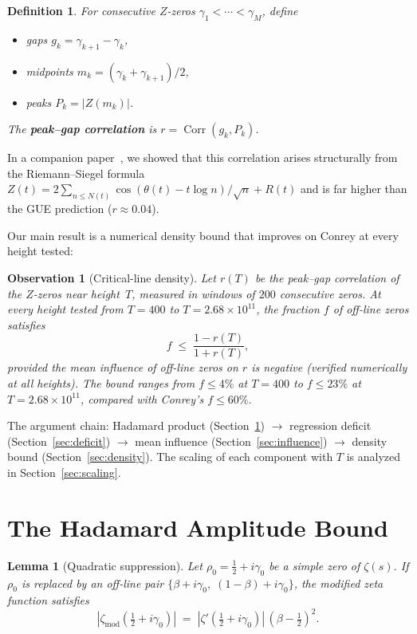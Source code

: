 \documentclass[11pt,a4paper]{article}
\newtheorem{lemma}[theorem]{Lemma}
\newtheorem{definition}[theorem]{Definition}
\newtheorem{observation}[theorem]{Observation}
\DeclareMathOperator{\Corr}{Corr}
\begin{document}
\begin{definition}\label{def:peakgap}
For consecutive $Z$-zeros $\gamma_1 < \cdots < \gamma_M$, define
\begin{itemize}[nosep]
\item gaps $g_k = \gamma_{k+1} - \gamma_k$,
\item midpoints $m_k = (\gamma_k+\gamma_{k+1})/2$,
\item peaks $P_k = |Z(m_k)|$.
\end{itemize}
The \textbf{peak--gap correlation} is $r = \Corr(g_k, P_k)$.
\end{definition}

In a companion paper~\cite{EigRigidity}, we showed that this correlation arises structurally from the Riemann--Siegel formula $Z(t) = 2\sum_{n \leq N(t)} \cos(\theta(t)-t\log n)/\sqrt{n} + R(t)$ and is far higher than the GUE prediction ($r \approx 0.04$).

Our main result is a numerical density bound that improves on Conrey at every height tested:

\begin{observation}[Critical-line density]\label{obs:density}
Let $r(T)$ be the peak--gap correlation of the $Z$-zeros near height~$T$, measured in windows of $200$ consecutive zeros.
At every height tested from $T = 400$ to $T = 2.68 \times 10^{11}$, the fraction $f$ of off-line zeros satisfies
\[
f \;\leq\; \frac{1 - r(T)}{1 + r(T)},
\]
provided the mean influence of off-line zeros on $r$ is negative (verified numerically at all heights).
The bound ranges from $f \leq 4\%$ at $T = 400$ to $f \leq 23\%$ at $T = 2.68 \times 10^{11}$, compared with Conrey's $f \leq 60\%$.
\end{observation}

The argument chain: Hadamard product (Section~\ref{sec:hadamard}) $\to$ regression deficit (Section~\ref{sec:deficit}) $\to$ mean influence (Section~\ref{sec:influence}) $\to$ density bound (Section~\ref{sec:density}).
The scaling of each component with $T$ is analyzed in Section~\ref{sec:scaling}.


\section{The Hadamard Amplitude Bound}\label{sec:hadamard}

\begin{lemma}[Quadratic suppression]\label{lem:hadamard}
Let $\rho_0 = \frac{1}{2}+i\gamma_0$ be a simple zero of $\zeta(s)$.
If $\rho_0$ is replaced by an off-line pair $\{\beta+i\gamma_0,\; (1{-}\beta)+i\gamma_0\}$, the modified zeta function satisfies
\[
|\zeta_{\mathrm{mod}}(\tfrac{1}{2}+i\gamma_0)| \;=\; |\zeta'(\tfrac{1}{2}+i\gamma_0)|\,(\beta - \tfrac{1}{2})^2.
\]
\end{lemma}
\end{document}
